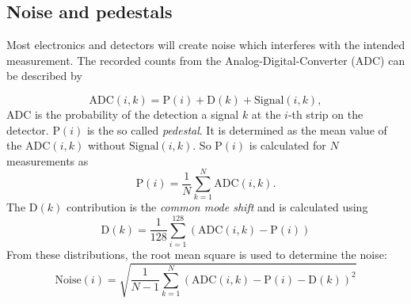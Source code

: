 \subsection{Noise and pedestals}
Most electronics and detectors will create noise which interferes with the intended measurement. The recorded counts from the Analog-Digital-Converter (ADC) can be described by

\begin{equation*}
	\mathrm{ADC}(i,k) = \mathrm{P}(i) + \mathrm{D}(k) + \mathrm{Signal}(i,k),
\end{equation*}
ADC is the probability of the detection a signal $k$ at the $i$-th strip on the detector. $\mathrm{P}(i)$ is the so called \textit{pedestal}. It is determined as the mean value of the $\mathrm{ADC}(i,k)$ without $\mathrm{Signal}(i,k)$. So $\mathrm{P}(i)$ is calculated for $N$ measurements as 
\begin{equation}
	\mathrm{P}(i) = \frac{1}{N} \sum_{k=1}^{N}\mathrm{ADC}(i,k).
	\label{eq:pedestal}
\end{equation}
The $\mathrm{D}(k)$ contribution is the \textit{common mode shift} and is calculated using 
\begin{equation}
	\mathrm{D}(k) = \frac{1}{128}\sum_{i=1}^{128}(\mathrm{ADC}(i,k) - \mathrm{P}(i))
	\label{eq:common_mode}
\end{equation}
From these distributions, the root mean square is used to determine the noise:
\begin{equation}
	\mathrm{Noise}(i)=\sqrt{\frac{1}{N-1}\sum_{k=1}^{N}(\mathrm{ADC}(i,k) - \mathrm{P}(i) - \mathrm{D}(k))^2}
	\label{eq:noise}
\end{equation}